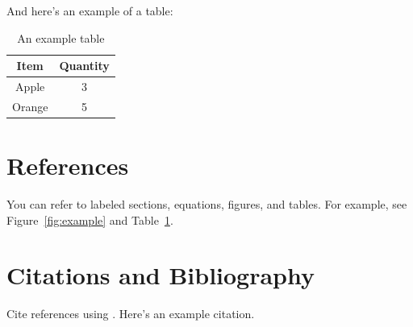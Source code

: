 \documentclass{article}
\begin{document}
And here's an example of a table:
\begin{table}[H]
    \centering
    \begin{tabular}{|c|c|}
        \hline
        \textbf{Item} & \textbf{Quantity} \\
        \hline
        Apple & 3 \\
        Orange & 5 \\
        \hline
    \end{tabular}
    \caption{An example table}
    \label{tab:example}
\end{table}

\section{References}
You can refer to labeled sections, equations, figures, and tables. For example, see Figure~\ref{fig:example} and Table~\ref{tab:example}.

\section{Citations and Bibliography}
Cite references using \cite{Hemingway1952}. Here's an example citation.



\end{document}
